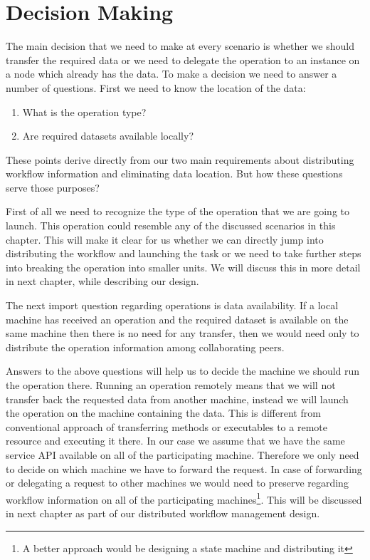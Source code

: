 \section{Decision Making}
The main decision that we need to make at every scenario is whether we should transfer the required data or we
need to delegate the operation to an instance on a node which already has the data. To make a decision we need to
answer a number of questions. First we need to know the location of the data:

\begin{enumerate}
\item What is the operation type?
\item Are required datasets available locally?
\end{enumerate}

These points derive directly from our two main requirements about distributing workflow information and 
eliminating data location. But how these questions serve those purposes?

First of all we need to recognize the type of the operation that we are going to launch. This operation could
resemble any of the discussed scenarios in this chapter. This will make it clear for us whether we can directly
jump into distributing the workflow and launching the task or we need to take further steps into breaking
the operation into smaller units. We will discuss this in more detail in next chapter, while describing our design.

The next import question regarding operations is data availability. If a local machine has received an operation
and the required dataset is available on the same machine then there is no need for any transfer, then we would need
only to distribute the operation information among collaborating peers.

Answers to the above questions will help us to decide the machine we should run the operation there. Running an
operation remotely means that we will not transfer back the requested data from another machine, instead we will launch
the operation on the machine containing the data. This is different from conventional approach of transferring methods
or executables to a remote resource and executing it there. In our case we assume that we have the same service API 
available on all of the participating machine. Therefore we only need to decide on which machine we have to forward
the request. In case of forwarding or delegating a request to other machines we would need to preserve regarding
workflow information on all of the participating machines\footnote{A better approach would be designing a state machine and distributing it}. 
This will be discussed in next chapter as part of our distributed workflow management design.